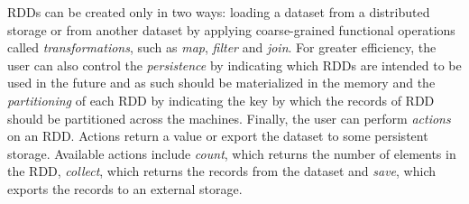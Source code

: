 RDDs can be created only in two ways: loading a dataset from a distributed storage or from another dataset by applying coarse-grained functional operations called \emph{transformations}, such as \emph{map}, \emph{filter} and \emph{join}. For greater efficiency, the user can also control the \emph{persistence} by indicating which RDDs are intended to be used in the future and as such should be materialized in the memory and the \emph{partitioning} of each RDD by indicating the key by which the records of RDD should be partitioned across the machines. Finally, the user can perform \emph{actions} on an RDD. Actions return a value or export the dataset to some persistent storage. Available actions include \emph{count}, which returns the number of elements in the RDD, \emph{collect}, which returns the records from the dataset and \emph{save}, which exports the records to an external storage.

